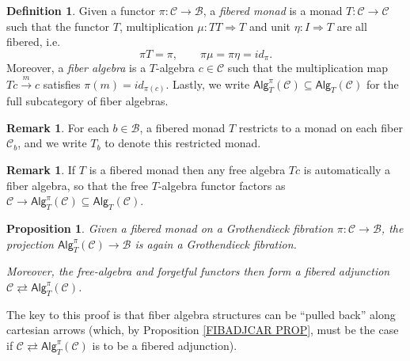 \documentclass[a4paper,10pt
,draft
]{article}%
\numberwithin{equation}{section}
\numberwithin{figure}{section}
\newtheorem{proposition}[equation]{Proposition}%
\theoremstyle{definition} %
\newtheorem{definition}[equation]{Definition}%
\newtheorem{remark}[equation]{Remark}%
\newcommand{\1}{\ensuremath{\mathbbm 1}}%
\begin{document}
\begin{definition}\label{FIBMON DEF}
	Given a functor $\pi \colon \mathcal{C} \to \mathcal{B}$,
	a \textit{fibered monad} is a monad $T \colon \mathcal{C} \to \mathcal{C}$ such that 
	the functor $T$,
	multiplication 
	$\mu \colon TT \Rightarrow T$
	and unit $\eta \colon I \Rightarrow T$
	are all fibered, i.e.
	\[
	\pi T = \pi,\qquad
	\pi\mu=\pi\eta=id_{\pi}.
	\]
	Moreover, a \textit{fiber algebra} is a $T$-algebra $c \in \mathcal{C}$
	such that the multiplication map
	$Tc \xrightarrow{m} c$ satisfies 
	$\pi(m)=id_{\pi(c)}$.
	Lastly, we write $\mathsf{Alg}^{\pi}_T(\mathcal{C}) \subseteq \mathsf{Alg}_T(\mathcal{C})$ for the full subcategory of fiber algebras.
\end{definition}


\begin{remark}
	For each $b\in \mathcal{B}$, a fibered monad $T$ restricts to a monad on each fiber $\mathcal{C}_b$, and we write $T_b$ to denote this restricted monad.
\end{remark}


\begin{remark}
	If $T$ is a fibered monad then any free algebra $Tc$ is automatically a fiber algebra, so that the free $T$-algebra functor factors
	as 
	$\mathcal{C} \to \mathsf{Alg}^{\pi}_T(\mathcal{C}) \subseteq \mathsf{Alg}_T(\mathcal{C})$.
\end{remark}



\begin{proposition}\label{FIBALGGR PROP}
	Given a fibered monad on a Grothendieck fibration $\pi \colon \mathcal{C} \to \mathcal{B}$,
	the projection $\mathsf{Alg}^{\pi}_T(\mathcal{C}) \to \mathcal{B}$
	is again a Grothendieck fibration.
	
	Moreover, the free-algebra and forgetful functors then form a fibered adjunction
	$\mathcal{C} \rightleftarrows \mathsf{Alg}^{\pi}_T(\mathcal{C})$.
\end{proposition}


The key to this proof is that fiber algebra structures can be ``pulled back'' along cartesian arrows
(which, by Proposition \ref{FIBADJCAR PROP}, must be the case if $\mathcal{C} \rightleftarrows \mathsf{Alg}^{\pi}_T(\mathcal{C})$ is to be a fibered adjunction). 
\end{document}
